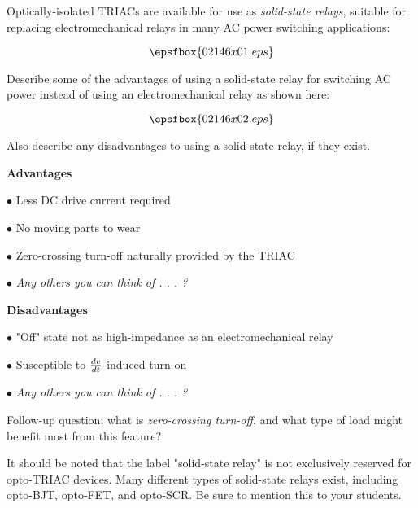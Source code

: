 

Optically-isolated TRIACs are available for use as {\it solid-state relays}, suitable for replacing electromechanical relays in many AC power switching applications:

$$\epsfbox{02146x01.eps}$$

Describe some of the advantages of using a solid-state relay for switching AC power instead of using an electromechanical relay as shown here:

$$\epsfbox{02146x02.eps}$$

Also describe any disadvantages to using a solid-state relay, if they exist.







\medskip
\goodbreak
\item{} {\bf Advantages}
\item{$\bullet$} Less DC drive current required
\item{$\bullet$} No moving parts to wear
\item{$\bullet$} Zero-crossing turn-off naturally provided by the TRIAC
\item{$\bullet$} {\it Any others you can think of . . . ?}
\medskip

\medskip
\goodbreak
\item{} {\bf Disadvantages}
\item{$\bullet$} "Off" state not as high-impedance as an electromechanical relay
\item{$\bullet$} Susceptible to ${dv \over dt}$-induced turn-on
\item{$\bullet$} {\it Any others you can think of . . . ?}
\medskip

\vskip 10pt

Follow-up question: what is {\it zero-crossing turn-off}, and what type of load might benefit most from this feature?







It should be noted that the label "solid-state relay" is not exclusively reserved for opto-TRIAC devices.  Many different types of solid-state relays exist, including opto-BJT, opto-FET, and opto-SCR.  Be sure to mention this to your students.




